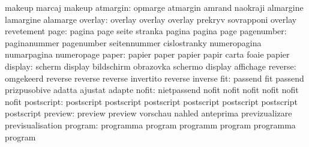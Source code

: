                            makeup                    marcaj
                           makeup
                 atmargin: opmarge                   atmargin
                           amrand                    naokraji
                           almargine                 lamargine
                           alamarge
                  overlay: overlay                   overlay
                           overlay                   prekryv
                           sovrapponi                overlay
                           revetement
                     page: pagina                    page
                           seite                     stranka
                           pagina                    pagina
                           page
               pagenumber: paginanummer              pagenumber
                           seitennummer              cislostranky
                           numeropagina              numarpagina
                           numeropage
                    paper: papier                    paper
                           papier                    papir
                           carta                     foaie
                           papier
                  display: scherm                    display
                           bildschirm                obrazovka
                           schermo                   display
                           affichage
                  reverse: omgekeerd                 reverse
                           reverse                   reverse
                           invertito                 reverse
                           inverse
                      fit: passend                   fit
                           passend                   prizpusobive
                           adatta                    ajustat
                           adapte
nofit: nietpassend             nofit
       nofit                   nofit
       nofit                   nofit
       nofit
               postscript: postscript                postscript
                           postscript                postscript
                           postscript                postscript
                           postscript
                  preview: preview                   preview
                           vorschau                  nahled
                           anteprima                 previzualizare
                           previsualisation
                  program: programma                 program
                           programm                  program
                           programma                 program
